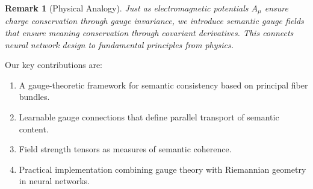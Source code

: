 \documentclass[12pt,letterpaper,twoside]{article}
\newtheorem{remarque}{Remark}[section]
\begin{document}
\begin{remarque}[Physical Analogy]
Just as electromagnetic potentials $A_\mu$ ensure charge conservation through gauge invariance, we introduce semantic gauge fields that ensure meaning conservation through covariant derivatives. This connects neural network design to fundamental principles from physics.
\end{remarque}

Our key contributions are:

\begin{enumerate}
\item A gauge-theoretic framework for semantic consistency based on principal fiber bundles.
\item Learnable gauge connections that define parallel transport of semantic content.
\item Field strength tensors as measures of semantic coherence.
\item Practical implementation combining gauge theory with Riemannian geometry in neural networks.
\end{enumerate}
\end{document}
